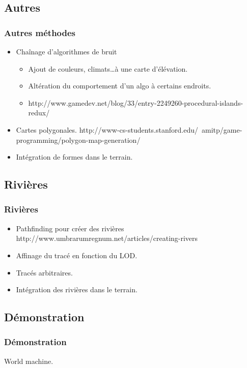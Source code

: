 \documentclass{beamer}
\begin{document}
\subsection{Autres}
\begin{frame}
  \frametitle{Autres méthodes}
  \begin{itemize}
  \item Chaînage d'algorithmes de bruit
    \begin{itemize}
    \item Ajout de couleurs, climats\dots à une carte d'élévation.
    \item Altération du comportement d'un algo à certains endroits.
    \item {\tiny http://www.gamedev.net/blog/33/entry-2249260-procedural-islands-redux/}
    \end{itemize}
  \item Cartes polygonales. {\tiny http://www-cs-students.stanford.edu/~amitp/game-programming/polygon-map-generation/}
  \item Intégration de formes dans le terrain.
  \end{itemize}
\end{frame}

\subsection{Rivières}

\begin{frame}
  \frametitle{Rivières}
  \begin{itemize}
  \item Pathfinding pour créer des rivières {\tiny http://www.umbrarumregnum.net/articles/creating-rivers}
  \item Affinage du tracé en fonction du LOD.
  \item Tracés arbitraires.
  \item Intégration des rivières dans le terrain.
  \end{itemize}
\end{frame}

\subsection{Démonstration}
\begin{frame}
  \frametitle{Démonstration}
  World machine.
\end{frame}
\end{document}
